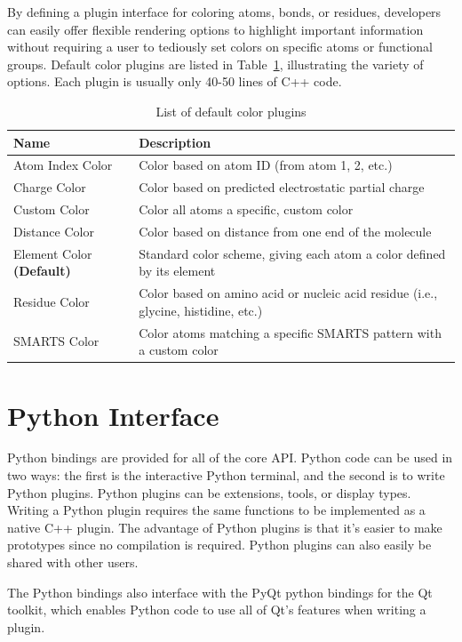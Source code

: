 \documentclass[10pt]{bmc_article}
\newenvironment{bmcformat}{\begin{raggedright}
\baselineskip20pt\sloppy\setboolean{publ}{false}}{\end{raggedright}
\baselineskip20pt\sloppy}
\begin{document}
\begin{bmcformat}
By defining a plugin interface for coloring atoms, bonds, or residues,
developers can easily offer flexible rendering options to highlight
important information without requiring a user to tediously set colors
on specific atoms or functional groups. Default color plugins are
listed in Table~\ref{color-table}, illustrating the variety of
options. Each plugin is usually only 40-50 lines of C++ code.

\begin{table}
  \caption{List of default color plugins}
  \label{color-table}
\begin{tabular}{l | l}
\hline
Name & Description \\
\hline
Atom Index Color & Color based on atom ID (from atom 1, 2, etc.) \\
Charge Color & Color based on predicted electrostatic partial charge \\
Custom Color & Color all atoms a specific, custom color \\
Distance Color & Color based on distance from one end of the
molecule \\
Element Color \textbf{(Default)} & Standard color scheme, giving each
atom a color defined by its element\\
Residue Color & Color based on amino acid or nucleic acid residue (i.e., glycine,
histidine, etc.) \\
SMARTS Color & Color atoms matching a specific SMARTS pattern with a
custom color \\
\hline
\end{tabular}
\end{table}

\section{Python Interface} %

Python bindings are provided for all of the core API. Python code can be used
in two ways: the first is the interactive Python terminal, and the second is to
write Python plugins. Python plugins can be extensions, tools, or display types.
Writing a Python plugin requires the same functions to be implemented as a
native C++ plugin. The advantage of Python plugins is that it's easier to make
prototypes since no compilation is required. Python plugins can also easily be
shared with other users.

The Python bindings also interface with the PyQt python bindings for the Qt
toolkit, which enables Python code to use all of Qt's features when writing a
plugin.


\end{bmcformat}
\end{document}
